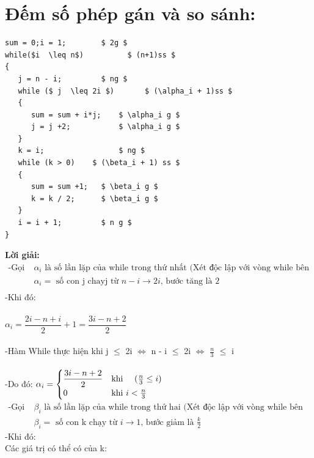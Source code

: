 \documentclass[12pt, letterpaper]{article}
\begin{document}
\section{Đếm số phép gán và so sánh:}
\begin{lstlisting}
sum = 0;i = 1;		  $ 2g $
while($i  \leq n$)			$ (n+1)ss $ 
{    
   j = n - i;		  $ ng $
   while ($ j  \leq 2i $)		$ (\alpha_i + 1)ss $
   {
      sum = sum + i*j;	  $ \alpha_i g $
      j = j +2;           $ \alpha_i g $		
   }
   k = i;             	  $ ng $
   while (k > 0)	$ (\beta_i + 1) ss $
   {
      sum = sum +1;	  $ \beta_i g $
      k = k / 2;	  $ \beta_i g $
   }
   i = i + 1;		  $ n g $
}
	\end{lstlisting}
	\textbf{Lời giải:} \\
	$ \begin{aligned}
		\text{-Gọi } & \alpha_i \text{ là số lần lặp của while trong thứ nhất (Xét độc lập với vòng while bên ngoài)} \\
					& \alpha_i = \text{ số con j chayj từ } n - i \rightarrow 2i \text{, bước tăng là 2} \\
	\end{aligned} $ \\
	-Khi đó:\\ \\
	$\alpha_i = \dfrac{2i - n + i}{2} + 1 = \dfrac{3i - n + 2}{2}$\\ \\
	-Hàm While thực hiện khi j $\leq$ 2i $\Leftrightarrow$ n - i $\leq$ 2i $\Leftrightarrow$ $\frac{n}{3}$ $\leq$ i\\ \\
	-Do đó: $\alpha_i =
	\begin{cases}
	\dfrac{3i - n + 2}{2} &\text{khi } \quad (\frac{n}{3} \leq i)\\
	0 &\text{khi } i < \frac{n}{3}
	\end{cases} \\ \\ $
	$ \begin{aligned}
		\text{-Gọi } & \beta_i \text{ là số lần lặp của while trong thứ hai (Xét độc lập với vòng while bên ngoài)} \\
					& \beta_i = \text{ số con k chạy từ } i \rightarrow 1 \text{, bước giảm là } \frac{k}{2}
	\end{aligned} $ \\
	-Khi đó:\\
	Các giá trị có thể có của k: \\ \\
\end{document}
